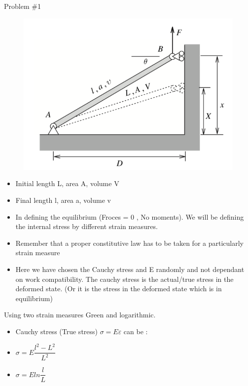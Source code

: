 	\begin{frame}{Problem \#1}
	\begin{figure}
		\centering
		\includegraphics[width=0.6\linewidth]{Figure/fig4}
		\caption{}
		\label{fig:fig1}
	\end{figure}
	\begin{itemize}
		\item Initial length L, area A, volume V
		\item  Final length l, area a, volume v
		
	\end{itemize}
	\end{frame}

	\begin{frame}
		\begin{itemize}
			\item In defining the equilibrium (Froces = 0 , No moments). We will be defining the internal stress by different strain measures.
			\item Remember that a proper constitutive law has to be taken for a particularly strain measure
			\item Here we have chosen the Cauchy stress and E randomly and not dependant on work compatibility. The cauchy stress is the actual/true stress in the deformed state. (Or it is the stress in the deformed state which is in equilibrium)
			
		\end{itemize}
		\begin{block}{Using two strain measures}
			Green and logarithmic.
			\begin{itemize}
				\item Cauchy stress (True stress) $\sigma = E \varepsilon$ can be :
				\item $\sigma = E \dfrac{l^2-L^2}{L^2}$
				\item $\sigma = E ln\dfrac{l}{L}$
			\end{itemize}
		\end{block}
	\end{frame}

